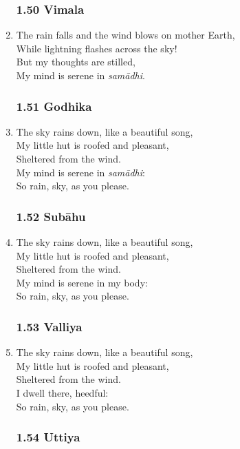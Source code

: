 \documentclass[10pt, openany]{book}
\begin{document}
\begin{enumerate}
\subsubsection*{1.50 Vimala}

\item The rain falls and the wind blows on mother Earth,\\
While lightning flashes across the sky!\\
But my thoughts are stilled,\\
My mind is serene in \emph{samādhi}.

\subsubsection*{1.51 Godhika}

\item The sky rains down, like a beautiful song,\\
My little hut is roofed and pleasant, \\
Sheltered from the wind.\\
My mind is serene in \emph{samādhi}:\\
So rain, sky, as you please.

\subsubsection*{1.52 Subāhu}

\item The sky rains down, like a beautiful song,\\
My little hut is roofed and pleasant, \\
Sheltered from the wind.\\
My mind is serene in my body:\\
So rain, sky, as you please.

\subsubsection*{1.53 Valliya}

\item The sky rains down, like a beautiful song,\\
My little hut is roofed and pleasant, \\
Sheltered from the wind.\\
I dwell there, heedful:\\
So rain, sky, as you please.

\subsubsection*{1.54 Uttiya}


\end{enumerate}
\end{document}
